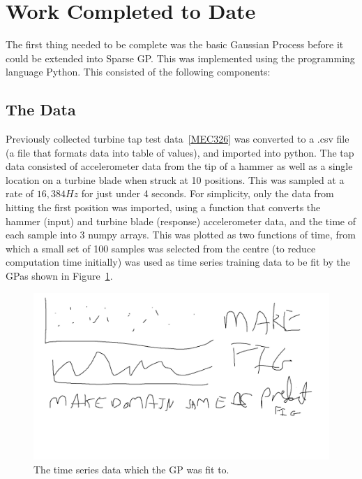 \documentclass[12pt]{article}
\begin{document}
    \section{Work Completed to Date}
    The first thing needed to be complete was the basic Gaussian Process before it could be extended into Sparse GP\@.
    This was implemented using the programming language Python.
    This consisted of the following components:
    \subsection{The Data}
    Previously collected turbine tap test data~\ref{MEC326} was converted to a .csv file (a file that formats data into table of values), and imported into python.
    The tap data consisted of accelerometer data from the tip of a hammer as well as a single location on a turbine blade when struck at 10 positions.
    This was sampled at a rate of $16,384 Hz$ for just under 4 seconds.
    For simplicity, only the data from hitting the first position was imported, using a function that converts the hammer (input) and turbine blade (response) accelerometer data, and the time of each sample into 3 numpy arrays.
    This was plotted as two functions of time, from which a small set of 100 samples was selected from the centre (to reduce computation time initially) was used as time series training data to be fit by the GP\@ as shown in Figure~\ref{fig:input-response-plot}.

    \begin{figure}[htbp]
        \centering
        \includegraphics[width=0.8\linewidth]{figures/input-response-plot/input-response-plot.png}
        \caption{The time series data which the GP was fit to.}
        \label{fig:input-response-plot}
    \end{figure}
\end{document}
